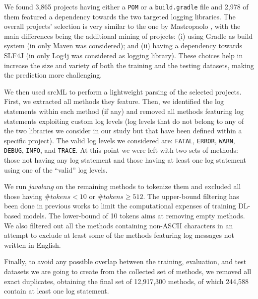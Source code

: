 We found 3,865 projects having either a \texttt{POM} or a \texttt{build.gradle} file and 2,978 of them featured a dependency towards the two targeted logging libraries. The overall projects' selection is very similar to the one by Mastropaolo \etal \cite{mastropaolo2022using}, with the main differences being the additional mining of projects: (i) using Gradle as build system (in \cite{mastropaolo2022using} only Maven was considered); and (ii) having a dependency towards SLF4J (in \cite{mastropaolo2022using} only Log4j was considered as logging library). These choices help in increase the size and variety of both the training and the testing datasets, making the prediction more challenging. 

We then used srcML \cite{srcml} to perform a lightweight parsing of the selected projects. First, we extracted all \java methods they feature. Then, we identified the log statements within each method (if any) and removed all methods featuring log statements exploiting custom log levels (\ie log levels that do not belong to any of the two libraries we consider in our study but that have been defined within a specific project). The valid log levels we considered are: \texttt{FATAL}, \texttt{ERROR}, \texttt{WARN}, \texttt{DEBUG}, \texttt{INFO}, and \texttt{TRACE}. At this point we were left with two sets of methods: those not having any log statement and those having at least one log statement using one of the ``valid'' log levels.

We run \emph{javalang} \cite{javalang} on the remaining methods to tokenize them and excluded all those having $\#tokens < 10$ or $\#tokens \geq 512$. The upper-bound filtering has been done in previous works \cite{ADD_CITATIONS_FROM_OTHER_GROUPS,mastropaolo2021empirical,tufano2021automating,ciniselli2021empirical} to limit the computational expenses of training DL-based models. The lower-bound of 10 tokens aims at removing empty methods. We also filtered out all the methods containing non-ASCII characters in an attempt to exclude at least some of the methods featuring log messages not written in English. 


Finally, to avoid any possible overlap between the training, evaluation, and test datasets we are going to create from the collected set of methods, we removed all exact duplicates, obtaining the final set of 12,917,300 \java methods, of which 244,588 contain at least one log statement. 

